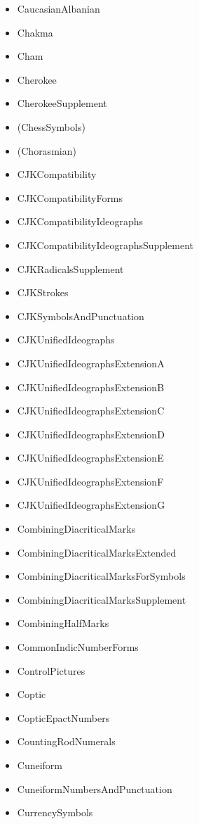 \documentclass{article}
\newenvironment{itemlist}{%
  \begin{itemize}
  \setlength{\itemsep}{0pt}
  \setlength{\parsep}{0pt}
  \setlength{\topsep}{0pt}
  \setlength{\partopsep}{0pt}
  \setlength{\parskip}{0pt}
  \setlength{\labelsep}{5pt}}%
{
  \end{itemize}}
\begin{document}
\begin{multicols*}{2}
\begin{itemlist}
        \item CaucasianAlbanian
        \item Chakma
        \item Cham
        \item Cherokee
        \item CherokeeSupplement
        \item (ChessSymbols)
        \item (Chorasmian)
        \item CJKCompatibility
        \item CJKCompatibilityForms
        \item CJKCompatibilityIdeographs
        \item CJKCompatibilityIdeographsSupplement
        \item CJKRadicalsSupplement
        \item CJKStrokes
        \item CJKSymbolsAndPunctuation
        \item CJKUnifiedIdeographs
        \item CJKUnifiedIdeographsExtensionA
        \item CJKUnifiedIdeographsExtensionB
        \item CJKUnifiedIdeographsExtensionC
        \item CJKUnifiedIdeographsExtensionD
        \item CJKUnifiedIdeographsExtensionE
        \item CJKUnifiedIdeographsExtensionF
        \item CJKUnifiedIdeographsExtensionG
        \item CombiningDiacriticalMarks
        \item CombiningDiacriticalMarksExtended
        \item CombiningDiacriticalMarksForSymbols
        \item CombiningDiacriticalMarksSupplement
        \item CombiningHalfMarks
        \item CommonIndicNumberForms
        \item ControlPictures
        \item Coptic
        \item CopticEpactNumbers
        \item CountingRodNumerals
        \item Cuneiform
        \item CuneiformNumbersAndPunctuation
        \item CurrencySymbols

\end{itemlist}
\end{multicols*}
\end{document}
